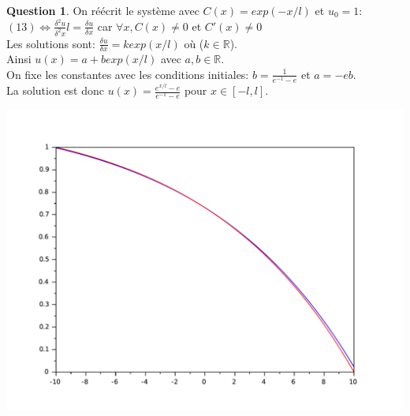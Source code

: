 \documentclass[a4paper]{article}
\theoremstyle{definition}
\newtheorem{que}{Question}
\begin{document}
	\begin{que}
		On réécrit le système avec $C(x)=exp(-x/l)$ et $u_0 = 1$: \\
		$(13) \Leftrightarrow \frac{\delta^2 u}{\delta^2 x} l = \frac{\delta u }{\delta x}$ car $\forall x, C(x) \ne 0$ et $C'(x) \ne 0$\\
		Les solutions sont: $ \frac{\delta u }{\delta x} = k exp(x/l)$ où ($k \in \mathbb{R}$). \\
		Ainsi $u(x) = a + b exp(x/l)$ avec $a, b \in \mathbb{R}$. \\
		On fixe les constantes avec les conditions initiales: $b=\frac{1}{e^{-1}-e}$ et $a=-eb$. \\
		La solution est donc $u(x)=\frac{e^{x/l}-e}{e^{-1}-e}$ pour $x \in [-l, l]$.\\
		\begin{center}
		\includegraphics[width=15cm]{graphes/q7.pdf}
		\label{fig1}
		\end{center}
	\end{que}
\end{document}
